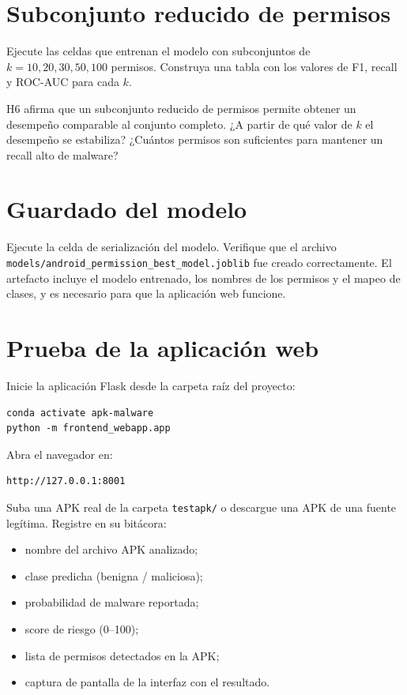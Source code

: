 \documentclass[
  coursetitle={Cómputo Nube y Tecnologías Emergentes},
  coursehours={96},
  coursedate={Verano 2026},
  doctype={Taller},
  otherlangs={english,french},
  authorname={Lázaro},
  authorsurname={Bustio-Martínez},
  authortitle={PhD},
  role={Profesor Investigador},
  email={lbustio@inaoe.mx},
  phone={5559504000},
  ext={7459},
  institution={Instituto Nacional de Astrofísica, Óptica y Electrónica (INAOE)},
  department={Maestría en Ciencias en Tecnologías de Seguridad},
  address={Luis Enrique Erro 1, Sta. Ma. Tonantzintla, San Andrés Cholula, CP 72840, Puebla, México},
  margin={0.5in}
]{../../lbustio_lecture_notes}
\begin{document}
\section{Subconjunto reducido de permisos}

Ejecute las celdas que entrenan el modelo con subconjuntos de $k = 10, 20, 30, 50, 100$ permisos. Construya una tabla con los valores de F1, recall y ROC-AUC para cada $k$.

\begin{tcolorbox}[title=Evidencia para H6]
H6 afirma que un subconjunto reducido de permisos permite obtener un desempeño comparable al conjunto completo. ¿A partir de qué valor de $k$ el desempeño se estabiliza? ¿Cuántos permisos son suficientes para mantener un recall alto de malware?
\end{tcolorbox}

\section{Guardado del modelo}

Ejecute la celda de serialización del modelo. Verifique que el archivo \texttt{models/android\_permission\_best\_model.joblib} fue creado correctamente. El artefacto incluye el modelo entrenado, los nombres de los permisos y el mapeo de clases, y es necesario para que la aplicación web funcione.

\section{Prueba de la aplicación web}

Inicie la aplicación Flask desde la carpeta raíz del proyecto:

\begin{lstlisting}
conda activate apk-malware
python -m frontend_webapp.app
\end{lstlisting}

Abra el navegador en:

\begin{lstlisting}
http://127.0.0.1:8001
\end{lstlisting}

Suba una APK real de la carpeta \texttt{testapk/} o descargue una APK de una fuente legítima. Registre en su bitácora:

\begin{itemize}
    \item nombre del archivo APK analizado;
    \item clase predicha (benigna / maliciosa);
    \item probabilidad de malware reportada;
    \item score de riesgo (0--100);
    \item lista de permisos detectados en la APK;
    \item captura de pantalla de la interfaz con el resultado.
\end{itemize}
\end{document}
